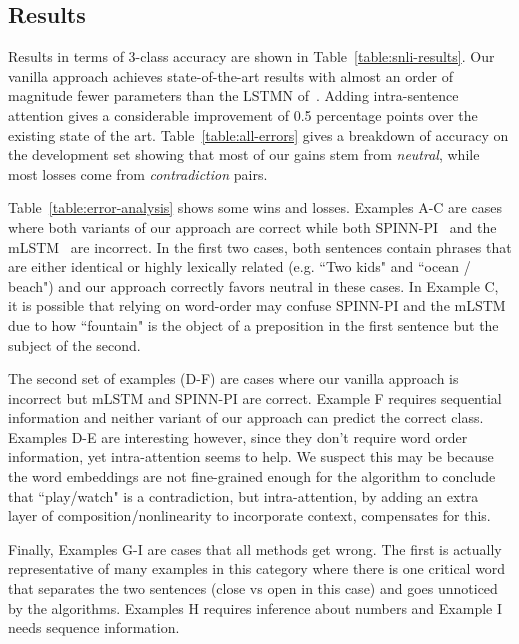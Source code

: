 \documentclass[11pt,letterpaper]{article}
\begin{document}
\subsection{Results}
Results in terms of 3-class accuracy are shown in Table~\ref{table:snli-results}.
Our vanilla approach achieves state-of-the-art results with almost an order of magnitude fewer parameters than the LSTMN of~. Adding intra-sentence attention gives a considerable improvement of 0.5 percentage points over the existing state of the art. Table~\ref{table:all-errors} gives a breakdown of accuracy on the development set showing that most of our gains stem from \textit{neutral}, while most losses come from \textit{contradiction} pairs.





Table~\ref{table:error-analysis} shows some wins and losses. Examples A-C are cases where both variants of our approach are correct while both SPINN-PI~\cite{bowman2016fast} and the mLSTM~\cite{wang2015learning} are incorrect. In the first two cases, both sentences contain phrases that are either identical or highly lexically related (e.g. ``Two kids" and ``ocean / beach") and our approach correctly favors neutral in these cases. In Example C, it is possible that relying on word-order may confuse SPINN-PI and the mLSTM due to how ``fountain" is the object of a preposition in the first sentence but the subject of the second.

The second set of examples (D-F) are cases where our vanilla approach is incorrect but mLSTM and SPINN-PI are correct. Example F requires sequential information and neither variant of our approach can predict the correct class. Examples D-E are interesting however, since they don't require word order information, yet intra-attention seems to help. We suspect this may be because the word embeddings are not fine-grained enough for the algorithm to conclude that ``play/watch" is a contradiction, but intra-attention, by adding an extra layer of composition/nonlinearity to incorporate context, compensates for this.

Finally, Examples G-I are cases that all methods get wrong. The first is actually representative of many examples in this category where there is one critical word that separates the two sentences (close vs open in this case) and goes unnoticed by the algorithms. Examples H requires inference about numbers and Example I needs sequence information.

\vspace{-0.1cm}
\end{document}
